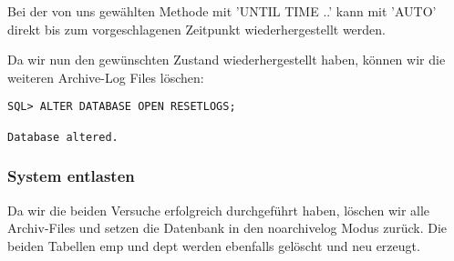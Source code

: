 \documentclass[11pt,a4paper,parskip=half]{scrartcl}
\begin{document}
Bei der von uns gewählten Methode mit 'UNTIL TIME ..' kann mit 'AUTO' direkt bis zum vorgeschlagenen Zeitpunkt wiederhergestellt werden.

Da wir nun den gewünschten Zustand wiederhergestellt haben, können wir die weiteren Archive-Log Files löschen:

\begin{lstlisting}
SQL> ALTER DATABASE OPEN RESETLOGS;

Database altered.
\end{lstlisting}
\subsubsection{System entlasten}
Da wir die beiden Versuche erfolgreich durchgeführt haben, löschen wir alle Archiv-Files und setzen die Datenbank in den noarchivelog Modus zurück. Die beiden Tabellen emp und dept werden ebenfalls gelöscht und neu erzeugt.
\end{document}
